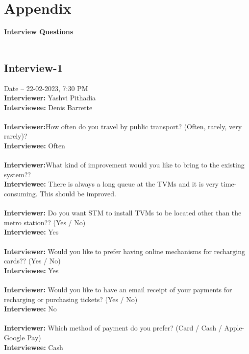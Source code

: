 \documentclass[a4paper,12pt]{report}
\begin{document}
\chapter{Appendix}
\textbf{\LARGE{Interview Questions}}\\\\
\section{Interview-1}
Date – 22-02-2023, 7:30 PM\\
\textbf{Interviewer:} Yashvi Pithadia\\
\textbf{Interviewee:} Denis Barrette \\\\
\textbf{Interviewer:}How often do you travel by public transport? (Often, rarely, very rarely)?\\
\textbf{Interviewee:} Often\\\\
\textbf{Interviewer:}What kind of improvement would you like to bring to the existing system??\\
\textbf{Interviewee:} There is always a long queue at the TVMs and it is very time-consuming. This should be improved.\\\\
\textbf{Interviewer:}  Do you want STM to install TVMs to be located other than the metro station?? (Yes / No)\\
\textbf{Interviewee:} Yes\\\\
\textbf{Interviewer:}  Would you like to prefer having online mechanisms for recharging cards?? (Yes / No)\\
\textbf{Interviewee:} Yes\\\\
\textbf{Interviewer:} Would you like to have an email receipt of your payments for recharging or purchasing tickets? (Yes / No)\\
\textbf{Interviewee:} No\\\\
\textbf{Interviewer:}  Which method of payment do you prefer? (Card / Cash / Apple-Google Pay)\\
\textbf{Interviewee:} Cash\\\\
\end{document}
